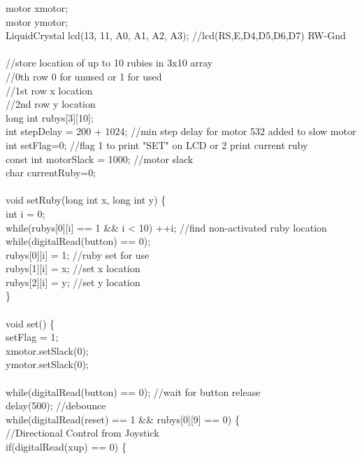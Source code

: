motor xmotor;\\
motor ymotor;\\
LiquidCrystal lcd(13, 11, A0, A1, A2, A3);\tabto*{7.5cm} //lcd(RS,E,D4,D5,D6,D7) RW\--Gnd\\
\\
//store location of up to 10 rubies in 3x10 array\\
//0th row 0 for unused or 1 for used\\
//1st row x location\\
//2nd row y location\\
long int rubys[3][10];\\
int stepDelay = 200 + 1024;\tabto*{7.5cm} //min step delay for motor  532 added to slow motor\\
int setFlag=0;\tabto*{7.5cm}  //flag 1 to print "SET" on LCD or 2 print current ruby\\
const int motorSlack = 1000;\tabto*{7.5cm} //motor slack \\
char currentRuby=0;\\
\\
void setRuby(long int x, long int y) \{\\
	int i = 0;\\
	while(rubys[0][i] == 1 \&\& i < 10) ++i;\tabto*{7.5cm}  //find non-activated ruby location\\
	while(digitalRead(button) == 0);\\
	rubys[0][i] = 1;\tabto*{7.5cm}   //ruby set for use\\
	rubys[1][i] = x;\tabto*{7.5cm}  //set x location\\
	rubys[2][i] = y;\tabto*{7.5cm}  //set y location\\
\}\\
\\
void set() \{\\	
\tabto*{.5cm} setFlag = 1;\\
\tabto*{.5cm} xmotor.setSlack(0);\\
\tabto*{.5cm} ymotor.setSlack(0);\\
\\	
\tabto*{.5cm} while(digitalRead(button) == 0);\tabto*{7.5cm}  //wait for button release\\
\tabto*{.5cm} delay(500);\tabto*{7.5cm}  //debounce\\
\tabto*{.5cm} while(digitalRead(reset) == 1 \&\& rubys[0][9] == 0) \{\\		
\tabto*{1cm}//Directional Control from Joystick\\
\tabto*{1cm} if(digitalRead(xup) == 0) \{\\
